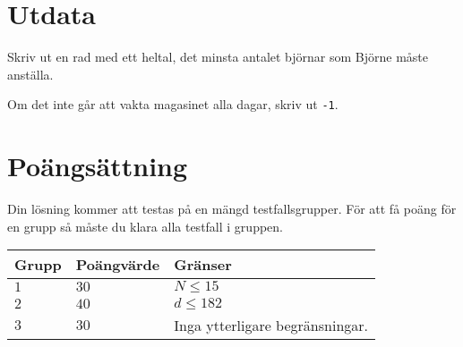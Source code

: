 \section*{Utdata}
Skriv ut en rad med ett heltal, det minsta antalet björnar som Björne måste anställa.

Om det inte går att vakta magasinet alla dagar, skriv ut \texttt{-1}.

\section*{Poängsättning}
Din lösning kommer att testas på en mängd testfallsgrupper.
För att få poäng för en grupp så måste du klara alla testfall i gruppen.

\noindent
\begin{tabular}{| l | l | l |}
\hline
Grupp & Poängvärde & Gränser \\ \hline
$1$   & $30$       & $N \leq 15$ \\ \hline
$2$   & $40$       & $d \leq 182$ \\ \hline
$3$   & $30$       & Inga ytterligare begränsningar. \\ \hline
\end{tabular}
